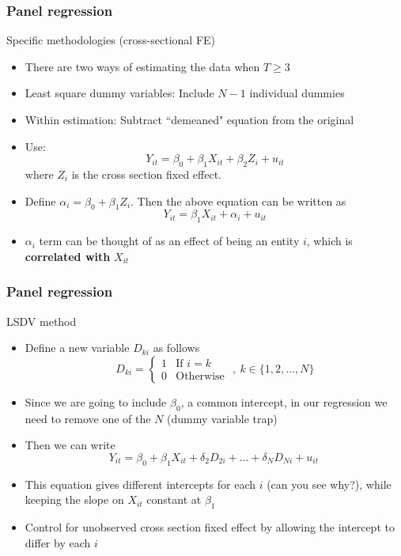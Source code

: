 \documentclass[compress]{beamer}
\begin{document}
\begin{frame}
\frametitle{Panel regression}
Specific methodologies (cross-sectional FE)
\begin{itemize}
\item There are two ways of estimating the data when $T\geq 3$
\item Least square dummy variables: Include $N-1$ individual dummies
\item Within estimation: Subtract ``demeaned" equation from the original
\item Use: 
\[
Y_{it}=\beta_0 + \beta_1X_{it}+\beta_2 Z_{i}+u_{it} \tag{1}
\]
where $Z_i$ is the cross section fixed effect.
\item Define  $\alpha_i = \beta_0 + \beta_1Z_i$. Then the above equation can be written as
\[
Y_{it}=\beta_1X_{it}+\alpha_{i}+u_{it} \tag{2}
\]
\item $\alpha_i$ term can be thought of as an effect of being an entity $i$, which is \textbf{correlated with} $X_{it}$
\end{itemize}
\end{frame}

\begin{frame}
\frametitle{Panel regression}
LSDV method
\begin{itemize}
\item Define a new variable $D_{ki}$ as follows
\[
D_{ki} = \begin{cases} 1 & \text{If $i=k$} \\
                                     0 & \text{Otherwise } \end{cases} , \ k\in\{1,2,...,N\}
\] 
\item Since we are going to include $\beta_0$, a common intercept, in our regression we need to remove one of the $N$ (dummy variable trap)
\item Then we can write
\[
Y_{it} = \beta_0 +\beta_1X_{it}+\delta_2D_{2i} + ... + \delta_ND_{Ni}+u_{it} \ \tag{LSDV}
\]
\item This equation gives different intercepts for each $i$ (can you see why?), while keeping the slope on $X_{it}$ constant at $\beta_1$ 
\item Control for unobserved cross section fixed effect by allowing the intercept to differ by each $i$
\end{itemize}
\end{frame}
\end{document}
